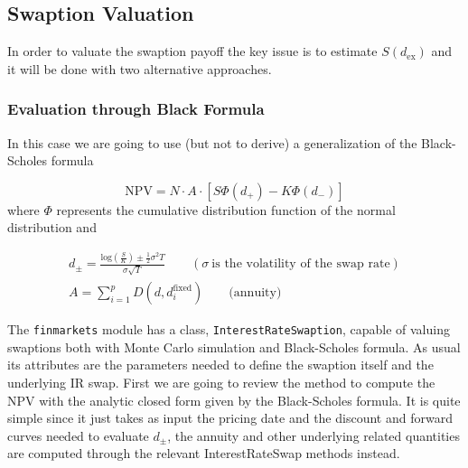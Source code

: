 \subsection{Swaption Valuation}

In order to valuate the swaption payoff the key issue is to estimate $S(d_{\mathrm{ex}})$ and it will be done with two alternative approaches.

\subsubsection{Evaluation through Black Formula}
\label{evaluation-through-black-scholes-formula}

In this case we are going to use (but not to derive) a generalization of the Black-Scholes formula

\begin{equation}
\mathrm{NPV} = N\cdot A\cdot [S \Phi(d_+) - K\Phi(d_-)]
\end{equation}
where $\Phi$ represents the cumulative distribution function of the normal distribution and

\begin{equation}
\begin{gathered}
d_{\pm} = \frac{\mathrm{log}(\frac{S}{K}) \pm \frac{1}{2}\sigma^{2}T}{\sigma\sqrt{T}}\qquad(\sigma~\textrm{is the volatility of the swap rate})\\
A = \sum_{i=1}^{p}D(d, d_{i}^{\mathrm{fixed}})\qquad\mathrm{(annuity})
\end{gathered}
\end{equation}

\begin{finmarkets}
The \texttt{finmarkets} module has a class, \texttt{InterestRateSwaption}, capable of valuing swaptions both with Monte Carlo simulation and Black-Scholes formula. As usual its attributes are the parameters needed to define the swaption itself and the underlying IR swap. First we are going to review the method to compute the NPV with the analytic closed form given by the Black-Scholes formula. It is quite simple since it just takes as input the pricing date and the discount and forward curves needed to evaluate $d_{\pm}$, the annuity and other underlying related quantities are computed through the relevant InterestRateSwap methods instead.
\end{finmarkets}

